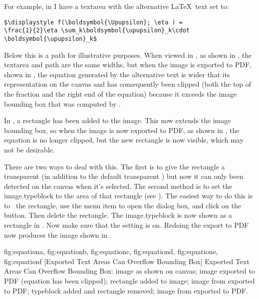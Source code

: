 For example, in  I have a \gls{textarea} with the
alternative \LaTeX\ text set to:
\begin{verbatim}
$\displaystyle f(\boldsymbol{\Upupsilon}; \eta ) = 
\frac{1}{2}\eta \sum_k\boldsymbol{\upupsilon}_k\cdot 
\boldsymbol{\upupsilon}_k$
\end{verbatim}
Below this is a \gls{path} for illustrative purposes. When viewed in
\FlowframTk, as shown in , the
\gls*{textarea} and \gls*{path} are the same widths, but when the
image is exported to PDF, shown in , the
equation generated by the alternative text is wider that its
representation on the \gls{canvas} and has consequently been clipped
(both the top of the fraction and the right end of the equation)
because it exceeds the image bounding box that was computed by
\FlowframTk.

In , a rectangle has been
added to the image. This now extends the image bounding box, so when
the image is now exported to PDF, as shown in
, the equation is no longer clipped,
but the new rectangle is now visible, which may not be desirable.

There are two ways to deal with this. The first is to give the
rectangle a \gls{transparent}  (in addition to the
default \gls{transparent} ) but now it can only been detected on the
\gls{canvas} when it's selected. The second method is to set the
\gls{image.typeblock} to the area of that rectangle (see ).
The easiest way to do this is to \select\ the rectangle, use the
 menu item to open the
 dialog box, and click on the
 button. Then delete the
rectangle. The \gls{image.typeblock} is now shown as a  rectangle in
. Now make sure that the
setting is on. Redoing the export to PDF now
produces the image shown in .

{
 {fig:equationa}{}{},
 {fig:equationb}{}{},
 {fig:equationc}{}{},
 {fig:equationd}{}{},
 {fig:equatione}{}{},
 {fig:equationf}{}{}
}
[Exported Text Areas Can Overflow Bounding Box]
{Exported Text Areas Can Overflow Bounding Box:
 image as shown on canvas;
 image exported to PDF (equation has been clipped);
 rectangle added to image;
 image from  exported to PDF;
 typeblock added and rectangle removed;
 image from  exported to PDF.}

